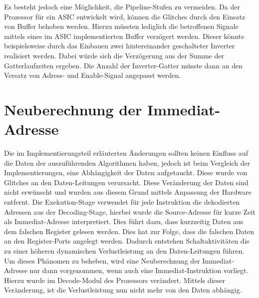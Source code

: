 %	


Es besteht jedoch eine Möglichkeit, die Pipeline-Stufen zu vermeiden.
Da der Prozessor für ein ASIC entwickelt wird, können die Glitches durch den Einsatz von Buffer behoben werden. Hierzu müssten lediglich die betroffenen Signale mittels eines im ASIC implementierten Buffer verzögert werden. Dieser könnte beispielsweise durch das Einbauen zwei hintereinander geschalteter Inverter realisiert werden. Dabei würde sich die Verzögerung aus der Summe der Gatterlaufzeiten ergeben. Die Anzahl der Inverter-Gatter müsste dann an den Versatz von Adress- und Enable-Signal angepasst werden. 

\section{Neuberechnung der Immediat-Adresse}
Die im Implementierungsteil erläuterten Änderungen sollten keinen Einfluss auf die Daten der auszuführenden Algorithmen haben, jedoch ist beim Vergleich der Implementierungen, eine Abhängigkeit der Daten aufgetaucht.
Diese wurde von Glitches an den Daten-Leitungen verursacht. Diese Veränderung der Daten sind nicht erwünscht und wurden aus diesem Grund mittels Anpassung der Hardware entfernt.
Die Exekution-Stage verwendet für jede Instruktion die dekodierten Adressen aus der Decoding-Stage, hierbei wurde die Source-Adresse für kurze Zeit als Immediat-Adresse interpretiert. Dies führt dazu, dass kurzzeitig Daten aus dem falschen Register gelesen werden. Dies hat zur Folge, dass die falschen Daten an den Register-Ports angelegt werden. Dadurch entstehen Schaltaktivitäten die zu einer höheren dynamischen Verlustleistung an den Daten-Leitungen führen. Um dieses Phänomen zu beheben,  wird eine Neuberechnung der Immediat-Adresse nur dann vorgenommen, wenn auch eine Immediat-Instruktion vorliegt. Hierzu wurde im Decode-Modul des Prozessors verändert. 
Mittels dieser Veränderung, ist die Verlustleistung nun nicht mehr von den Daten abhängig.

